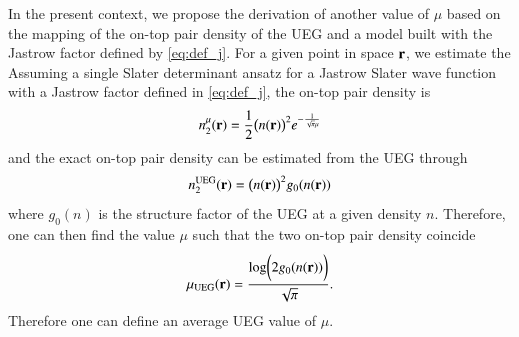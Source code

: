 \documentclass[aip,jcp,reprint,noshowkeys,superscriptaddress]{revtex4-1}
\newcommand{\muueg}{\mu_{\text{UEG}}}
\begin{document}
In the present context, we propose the derivation of another value of $\mu$ based on the mapping of the on-top pair density of the UEG and a model built with the Jastrow factor defined by \eqref{eq:def_j}. 
For a given point in space ${\bf r}$, we estimate the 
Assuming a single Slater determinant ansatz for a Jastrow Slater wave function with a Jastrow factor defined in \eqref{eq:def_j}, the on-top pair density is 
\begin{equation}
 n_2^\mu({\bf r}) = \frac{1}{2}\big(n({\bf r})\big)^2 e^{-\frac{1}{\sqrt{\pi}\mu}}
\end{equation}
and the exact on-top pair density can be estimated from the UEG through 
\begin{equation}
 n_2^{\text{UEG}}({\bf r}) = \big(n({\bf r})\big)^2g_0(n({\bf r}))
\end{equation}
where $g_0( n)$ is the structure factor of the UEG at a given density $n$. 
Therefore, one can then find the value $\mu$ such that the two on-top pair density coincide
\begin{equation}
 \muueg({\bf r}) = \frac{\text{log}\bigg(2 g_0(n({\bf r}))\bigg) }{\sqrt{\pi}}.
\end{equation}
Therefore one can define an average UEG value of $\mu$.
\end{document}
